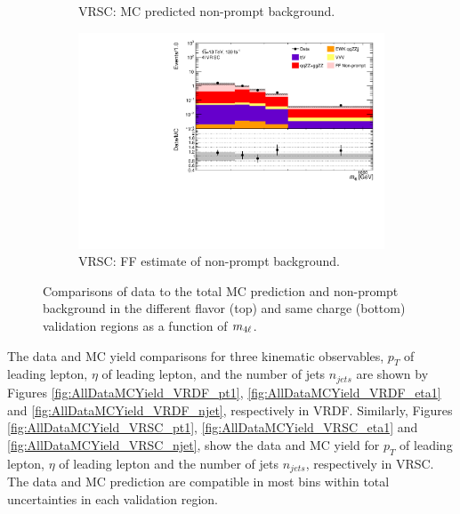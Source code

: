 \begin{figure}[!htbp]
\begin{subfigure}{.49\textwidth}
        \caption{VRSC: MC predicted non-prompt background.\label{subfig:VRSCMCRed}}
    \end{subfigure}
    \begin{subfigure}{.49\textwidth}
        \centering
        \includegraphics[width = 0.85\linewidth]{figures/Analysis/Background/Overlay_VRSC_FFApplied_M4l.pdf}
        \caption{VRSC: FF estimate of non-prompt background.\label{subfig:VRSCFF}}
    \end{subfigure}
    \caption{ Comparisons of data to the total MC prediction and non-prompt background in the different flavor (top) and same charge (bottom) validation regions as a function of $m_{4\ell}$.\label{fig:VRDataMCYield}}
\end{figure}

The data and MC yield comparisons for three kinematic observables, $p_{T}$ of leading lepton, $\eta$ of leading lepton, and the number of jets $n_{jets}$ are shown by Figures \ref{fig:AllDataMCYield_VRDF_pt1}, \ref{fig:AllDataMCYield_VRDF_eta1} and \ref{fig:AllDataMCYield_VRDF_njet}, respectively in VRDF. Similarly, Figures \ref{fig:AllDataMCYield_VRSC_pt1}, \ref{fig:AllDataMCYield_VRSC_eta1} and \ref{fig:AllDataMCYield_VRSC_njet}, show the data and MC yield for $p_{T}$ of leading lepton, $\eta$ of leading lepton and the number of jets $n_{jets}$, respectively in VRSC. The data and MC prediction are compatible in most bins within total uncertainties in each validation region.

